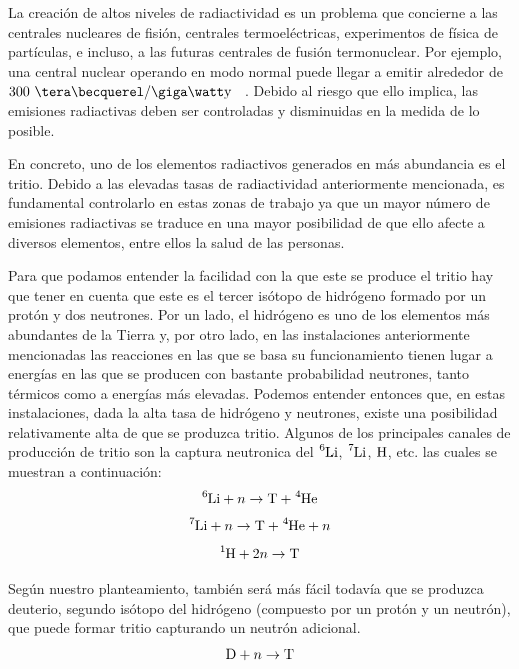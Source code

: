 La creación de altos niveles de radiactividad es un problema que concierne  a las  centrales nucleares de fisión, centrales termoeléctricas,  experimentos de física de partículas, e incluso, a las  futuras centrales de fusión termonuclear.  Por ejemplo, una central nuclear operando en modo normal puede llegar a emitir alrededor de $300\ \tera\becquerel/\giga\watt\mathrm{y}$ ~\cite{300TBq}.  Debido al riesgo que ello implica, las emisiones radiactivas deben ser controladas y disminuidas en la medida de lo posible.

En concreto, uno de los elementos radiactivos generados en más abundancia es el tritio. Debido a las elevadas tasas de radiactividad anteriormente mencionada, es fundamental controlarlo en estas zonas de trabajo ya que un mayor número de emisiones radiactivas se traduce en una mayor posibilidad de que ello afecte a diversos elementos, entre ellos la salud de las personas.

Para que podamos entender la facilidad con la que este se produce el tritio hay que tener en cuenta que este es el tercer isótopo de hidrógeno formado por un protón y dos neutrones. Por un lado, el hidrógeno es uno de los elementos más abundantes de la Tierra y, por otro lado, en las instalaciones anteriormente mencionadas  las reacciones en las que se basa su funcionamiento tienen lugar a energías  en las que se producen con bastante probabilidad neutrones, tanto térmicos como a energías más elevadas. 
Podemos entender entonces que, en estas instalaciones, dada la alta tasa de hidrógeno y neutrones, existe una posibilidad relativamente alta de que se produzca tritio. Algunos de los principales canales de producción de tritio son la captura neutronica del $\ce{^6Li}$, $\ce{^7Li}$, $\ce{H}$, etc. las cuales se muestran a continuación:
\begin{equation}
\ce{^{6}Li} + n \rightarrow \ce{T} + \ce{^{4}He}
\label{capneuLi6}
\end{equation}
\begin{equation}
\ce{^{7}Li} + n \rightarrow  \ce{T} + \ce{^{4}He} + n
\label{capneuLi7}
\end{equation}
\begin{equation}
\ce{^{1}H} + 2n \rightarrow  \ce{T}  
\label{capneuH}
\end{equation}

Según nuestro planteamiento, también será más fácil todavía que se produzca deuterio, segundo isótopo del hidrógeno (compuesto por un protón y un neutrón), que puede formar tritio capturando un neutrón adicional. 
\begin{equation}
\ce{D} + n \rightarrow  \ce{T}  
\label{capneuD}
\end{equation}


